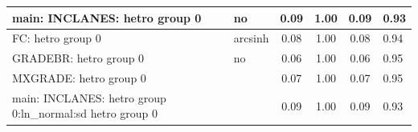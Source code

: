 \begin{table}
\begin{center}
\begin{tabular}{|l|l|c|c|c|l|}
			\hline
			main: INCLANES: hetro group 0 & no & 0.09 & 1.00 & 0.09 & 0.93 \\
			\hline
			FC: hetro group 0 & arcsinh & 0.08 & 1.00 & 0.08 & 0.94 \\
			\hline
			GRADEBR: hetro group 0 & no & 0.06 & 1.00 & 0.06 & 0.95 \\
			\hline
			MXGRADE: hetro group 0 &  & 0.07 & 1.00 & 0.07 & 0.95 \\
			\hline
			main: INCLANES: hetro group 0:ln_normal:sd  hetro group 0 &  & 0.09 & 1.00 & 0.09 & 0.93 \\
			\hline
		\end{tabular}
	\end{center}
\end{table}
